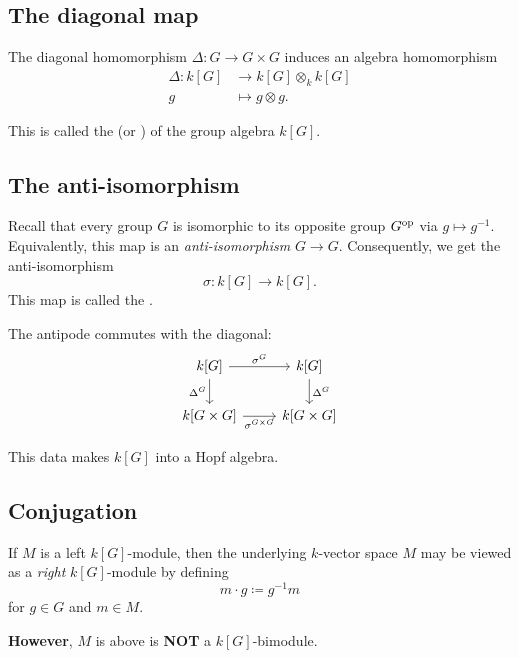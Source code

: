 \documentclass[12pt]{article}
\begin{document}
\subsection{The diagonal map}

The diagonal homomorphism $\Delta \colon G \to G \times G$ induces an algebra homomorphism
\begin{align*} 
	\Delta \colon k[G] &\to k[G] \otimes_{k} k[G] \\
	g &\mapsto g \otimes g.
\end{align*}

This is called the  (or ) of the group algebra $k[G]$.

\subsection{The anti-isomorphism}

Recall that every group $G$ is isomorphic to its opposite group $G^{\operatorname{op}}$ via $g \mapsto g^{-1}$. 
Equivalently, this map is an \emph{anti-isomorphism} $G \to G$. 
Consequently, we get the anti-isomorphism 
\begin{equation*} 
	\sigma \colon k[G] \to k[G].
\end{equation*}
This map is called the .

The antipode commutes with the diagonal:
\begin{equation*} 
	\begin{tikzcd}
		k[G] \arrow[r, "\sigma^{G}"] \arrow[d, "\Delta^{G}"'] & k[G] \arrow[d, "\Delta^{G}"] \\
		k[G \times G] \arrow[r, "\sigma^{G \times G}"'] & k[G \times G]
	\end{tikzcd}
\end{equation*}

This data makes $k[G]$ into a Hopf algebra.

\subsection{Conjugation} \label{subsec:conjugation}

If $M$ is a left $k[G]$-module, then the underlying $k$-vector space $M$ may be viewed as a \emph{right} $k[G]$-module by defining
\begin{equation*} 
	m \cdot g \coloneqq g^{-1}m
\end{equation*}
for $g \in G$ and $m \in M$.

\textbf{However}, $M$ is above is \textbf{{\color{red} NOT}} a $k[G]$-bimodule.
\end{document}
